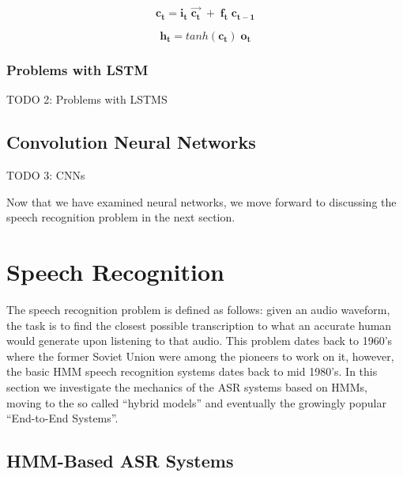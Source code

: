 



\begin{equation}
\label{eq:11}
\mathbf{c_t} = \mathbf{i_t } \; \mathbf{\vec{c_t}} \; + \;  \mathbf{f_t} \; \mathbf{c_{t-1}}
\end{equation}

\begin{equation}
\label{eq:12}
\mathbf{h_t} = tanh(\mathbf{c_t}) \; \mathbf{o_t}
\end{equation}




\subsubsection{Problems with \ac{LSTM}}
\label{conc:subsub7}
TODO 2: Problems with LSTMS

\subsection{Convolution Neural Networks} 
\label{bg:sub3}
TODO 3: CNNs






Now that we have examined neural networks, we move forward to discussing the speech recognition problem in the next section.

\section{Speech Recognition} \label{bg:s3}

The speech recognition problem is defined as follows: given an audio waveform, the task is to find the closest possible transcription to what an accurate human would generate upon listening to that audio. This problem dates back to 1960's where the former Soviet Union were among the pioneers to work on it, however, the basic \ac{HMM} speech recognition systems dates back to mid 1980's. In this section we investigate the mechanics of the \ac{ASR} systems based on \ac{HMM}s, moving to the so called \enquote{hybrid models} and eventually the growingly popular \enquote{End-to-End Systems}.

\subsection{HMM-Based \ac{ASR} Systems} 
\label{bg:sub4}

